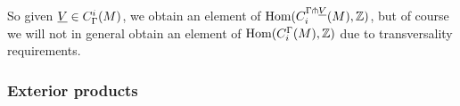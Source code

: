 So given $\underline{V} \in C^i_\Gamma(M)$, we obtain an element of $\textup{Hom}(C_i^{\Gamma\pitchfork \underline{V}}(M),\mathbb{Z})$, but of course we will not in general obtain an element of $\textup{Hom}(C_i^{\Gamma}(M),\mathbb{Z})$ due to transversality requirements.

\begin{comment}
\begin{proof}
If $\uV,\uW \in C^*_\Gamma(N)$ are represented by $f \colon V \to N$ and $g \colon W \to N$ that are transverse to $h$, then $\uV+\uW$ is represented by $V \sqcup W$, which will also be transverse to $h$. So $C^*_{\Gamma\pf h}(N)$ is closed under addition. If $f \colon V \to N$ is transverse to $h$ then so is $-f$, i.e.\ $f$ with the opposite co-orientation, so $C^*_{\Gamma\pf h}(N)$ is closed under taking negatives. The empty map $\emptyset \to N$ is always transverse to $h$ (since there are no points at which to check the tangent space condition), and so $0 \in C^*_{\Gamma\pf h}(N)$. Finally, if $\uV$ is represented by $f \colon V \to N$ transverse to $h$, then by definition $\bd V \to N$ is transverse to $h$, so $\bd \uV \in C^*_{\Gamma\pf h}(N)$. Therefore, $C^*_{\Gamma\pf h}(N)$, is a subcomplex of $C^*_{\Gamma}(N)$.

To how that $h^*$ is well defined on $C^*_{\Gamma\pf h}(N)$ we must show that it does not depend on the choice of representative $V$. Suppose $V$ and $V'$ both represent $\uV$ and are transverse to $h$. Then $V \sqcup -V'$ is transverse to $h$ and an element of $Q^*(N)$. So by \cref{L: pullback map Q}, $h^*(V \sqcup -V')$, which is by definition $(V \sqcup -V') \times_N M = (V \times_N M) \sqcup (-V' \times_N M)$ mapping to $M$, is an element of $Q^*(M)$. So $h^*(V)$ and $h^*(V')$ represent the same element of $C^*_{\Gamma}(M)$. Thus $h^*$ is well defined.

To see that $h^*$ is a homomorphism, let $V,W \to N$ represent elements of $C^*_{\Gamma}(N)$ that are transverse to $h$. Then
$$h^*(\uV+\uW) = \underline{h^*(V \sqcup W)} = \underline{h^*(V) \sqcup h^*(W)} = \underline{h^*(V)}+\underline{h^*(W)},$$
using the definitions, obvious properties of the pullback and \cref{L: co/chains well defined}. Furthermore, $h^*$ is a chain map by \cref{leibniz}, as $\bd M = \emptyset$.
\end{proof}
\end{comment}

\subsubsection{Exterior products}\label{S: exterior chain products}

